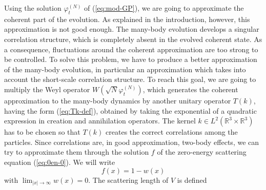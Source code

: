 \documentclass[11pt,a4paper]{article}
\newcommand{\bR}{{\mathbb R}}
\begin{document}
\medskip

Using the solution $\varphi_t^{(N)}$ of (\ref{eq:mod-GP}), we are going to approximate the coherent part of the evolution. As explained in the introduction, however, this approximation is not good enough. The many-body evolution develops a singular correlation structure, which is completely absent in the evolved coherent state. As a consequence, fluctuations around the coherent approximation are too strong to be controlled. To solve this problem, we have to produce a better approximation of the many-body evolution, in particular an approximation which takes into account the short-scale correlation structure. To reach this goal, we are going to multiply the Weyl operator $W(\sqrt{N} \varphi_t^{(N)})$, which generates the coherent approximation to the many-body dynamics by another unitary operator $T(k)$, having the form (\ref{eq:Tk-def}), obtained by taking the exponential of a quadratic expression in creation and annihilation operators. The kernel $k \in L^2 (\bR^3 \times \bR^3)$ has to be chosen so that $T(k)$ creates the correct correlations among the particles. Since correlations are, in good approximation, two-body effects, we can try to approximate them through the solution $f$ of the zero-energy scattering equation (\ref{eq:0en-0}). We will write 
%
\begin{equation}\label{eq:wdef}
  f (x) = 1 - w (x)
\end{equation}
with $\lim_{|x|\to\infty} w(x) = 0$. The scattering length of $V$ is defined
\end{document}
